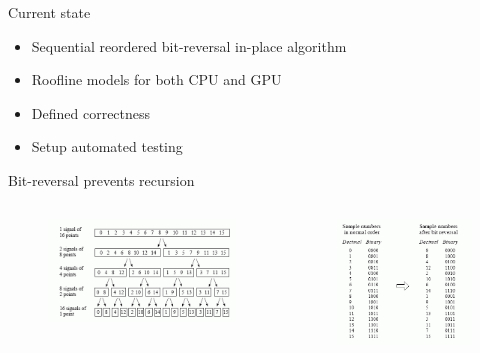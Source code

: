\documentclass{beamer}
\begin{document}
\begin{frame}{Current state}
	\begingroup
	\small
	\begin{itemize}
		\item Sequential reordered bit-reversal in-place algorithm
		\item Roofline models for both CPU and GPU
		\item Defined correctness
		\item Setup automated testing
	\end{itemize}
	\endgroup
\end{frame}

\begin{frame}{Bit-reversal prevents recursion}
	\begingroup
	\small
	\begin{columns}
		\begin{column}{0.50\textwidth}
			\begin{figure}
				\includegraphics[width=1\textwidth,center]{resources/images/split.png}
			\end{figure}
		\end{column}
		\begin{column}{0.50\textwidth}
			\begin{figure}
				\includegraphics[width=1\textwidth,center]{resources/images/reverse.png}
			\end{figure}
		\end{column}
	\end{columns}


\end{frame}
\end{document}
